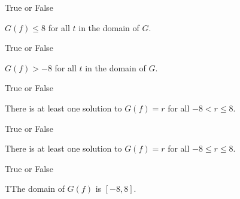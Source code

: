 \documentclass{ximera}
\begin{document}
\begin{exercise}
\begin{question} True or False

$G(f) \leq 8$ for all $t$ in the domain of $G$.

\begin{multipleChoice}
\end{multipleChoice}
\end{question}








\begin{question} True or False

$G(f) > -8$ for all $t$ in the domain of $G$.

\begin{multipleChoice}
\end{multipleChoice}
\end{question}






\begin{question} True or False

There is at least one solution to $G(f) = r$ for all $-8 < r \leq 8$.

\begin{multipleChoice}
\end{multipleChoice}
\end{question}






\begin{question} True or False

There is at least one solution to $G(f) = r$ for all $-8 \leq r \leq 8$.

\begin{multipleChoice}
\end{multipleChoice}
\end{question}





\begin{question} True or False

TThe domain of $G(f)$ is $[-8, 8]$.

\begin{multipleChoice}
\end{multipleChoice}
\end{question}







\end{exercise}
\end{document}
